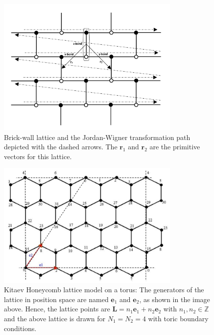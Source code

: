 \documentclass{article}
\begin{document}
\begin{figure}[h!]
	\centering
	\includegraphics[width=0.8\textwidth]{./images/Jor-Wig}
	\caption{\label{jor} Brick-wall lattice and the Jordan-Wigner transformation path depicted with the dashed arrows. The $\textbf{r}_1$ and $\textbf{r}_2$ are the primitive vectors for this lattice.} 
	\label{fig:fig01}
\end{figure}

\begin{figure}[h!]
	\centering
	\includegraphics[width=0.8\textwidth]{./images/diag_1.png}
	\caption{\label{tab:r_space} Kitaev Honeycomb lattice model on a torus: The generators of the lattice in position space are named
	$\textbf{e}_{1}$ and  $\textbf{e}_{2}$, as shown in the image above. Hence, the lattice points are $\textbf{L} = n_{1}\textbf{e}_{1} + 
	n_{2}\textbf{e}_{2}$ with $n_{1}, n_{2} \in \mathbb{Z}$ and the above lattice is drawn for $N_{1} = N_{2} = 4 $ with toric boundary conditions.} 
	\label{fig:fig1}
\end{figure}
\end{document}
